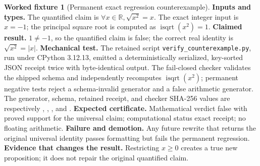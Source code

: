 \documentclass[11pt,a4paper]{article}
\theoremstyle{definition}
\newtheorem{fixture}[definition]{Worked fixture}
\theoremstyle{plain}
\theoremstyle{remark}
\begin{document}
\begin{fixture}[Permanent exact regression counterexample]\label{fix:receipt}
\textbf{Inputs and types.}
The quantified claim is
\(\forall x\in\mathbb R,\sqrt{x^2}=x\).  The exact integer input is \(x=-1\);
the principal square root is computed as
\(\operatorname{isqrt}(x^2)=1\).
\textbf{Claimed result.}  \(1\ne-1\), so the quantified claim is false; the
correct real identity is \(\sqrt{x^2}=|x|\).
\textbf{Mechanical test.}
The retained script \texttt{verify\_counterexample.py}, run under CPython
3.12.13, emitted a deterministically serialized, key-sorted JSON receipt twice
with byte-identical output.  The fail-closed checker validates the shipped
schema and independently recomputes \(\operatorname{isqrt}(x^2)\); permanent
negative tests reject a schema-invalid generator and a false arithmetic
generator.  The generator, schema, retained receipt, and checker SHA-256
values are respectively
\texttt{},
\texttt{},
\texttt{},
and
\texttt{}.
\textbf{Expected certificate.}  Mathematical verdict false with proved
support for the universal claim; computational status exact receipt; no
floating arithmetic.
\textbf{Failure and demotion.}  Any future rewrite that returns the original
universal identity passes formatting but fails the permanent regression.
\textbf{Evidence that changes the result.}  Restricting \(x\ge0\) creates a
true new proposition; it does not repair the original quantified claim.
\end{fixture}
\end{document}
